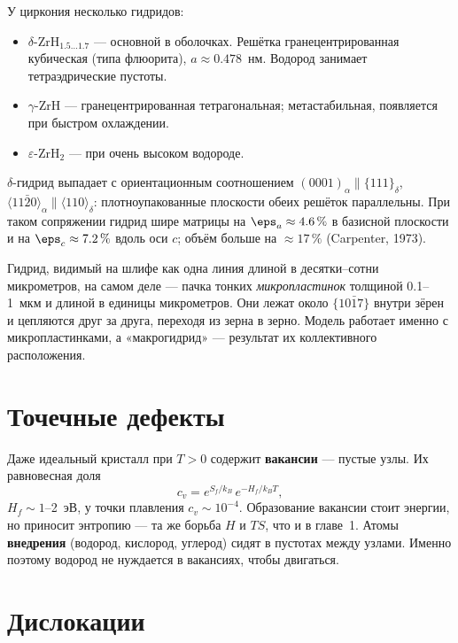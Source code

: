 У циркония несколько гидридов:
\begin{itemize}
\item $\delta$-ZrH$_{1.5\ldots1.7}$ --- основной в оболочках. Решётка гранецентрированная кубическая (типа
  флюорита), $a\approx0.478$~нм. Водород занимает тетраэдрические пустоты.
\item $\gamma$-ZrH --- гранецентрированная тетрагональная; метастабильная, появляется при быстром охлаждении.
\item $\varepsilon$-ZrH$_2$ --- при очень высоком водороде.
\end{itemize}
$\delta$-гидрид выпадает с ориентационным соотношением $(0001)_\alpha\parallel\{111\}_\delta$,
$\langle11\bar20\rangle_\alpha\parallel\langle110\rangle_\delta$: плотноупакованные плоскости обеих решёток
параллельны. При таком сопряжении гидрид шире матрицы на $\eps_a\approx4.6\,\%$ в базисной плоскости и на
$\eps_c\approx7.2\,\%$ вдоль оси $c$; объём больше на $\approx17\,\%$ (Carpenter, 1973).

\begin{zrbox}
Гидрид, видимый на шлифе как одна линия длиной в десятки--сотни микрометров, на самом деле --- пачка тонких
\emph{микропластинок} толщиной 0.1--1~мкм и длиной в единицы микрометров. Они лежат около $\{10\bar17\}$ внутри зёрен
и цепляются друг за друга, переходя из зерна в зерно. Модель работает именно с микропластинками, а «макрогидрид»
--- результат их коллективного расположения.
\end{zrbox}

\section{Точечные дефекты}

Даже идеальный кристалл при $T>0$ содержит \textbf{вакансии} --- пустые узлы. Их равновесная доля
\begin{equation}
c_v = e^{S_f/k_B}\,e^{-H_f/k_BT},
\end{equation}
$H_f\sim1$--2~эВ, у точки плавления $c_v\sim10^{-4}$. Образование вакансии стоит энергии, но приносит
энтропию --- та же борьба $H$ и $TS$, что и в главе~1. Атомы \textbf{внедрения} (водород, кислород, углерод)
сидят в пустотах между узлами. Именно поэтому водород не нуждается в вакансиях, чтобы двигаться.

\section{Дислокации}

